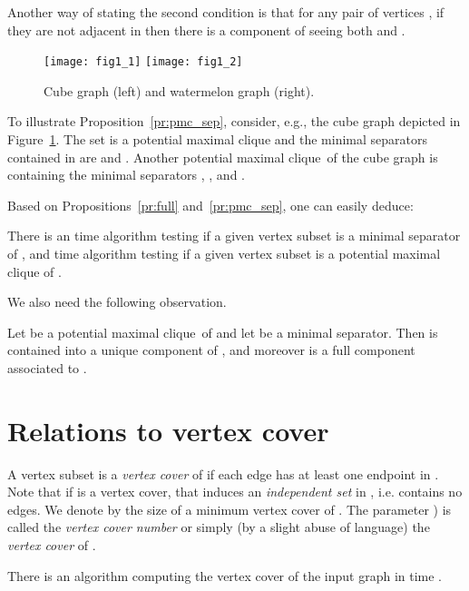 \documentclass{llncs}
\newcommand{\pmc}{potential maximal clique}
\begin{document}
Another way of stating the second condition is that for any pair of vertices , if they are not adjacent in  then 
there is a component  of  seeing both  and . 

\begin{figure}[h]
\label{fi:cubewaterm}
\begin{center}
\texttt{[image: fig1\_1]}
\texttt{[image: fig1\_2]}
\end{center}
\caption{Cube graph (left) and watermelon graph (right).}
\end{figure}


To illustrate Proposition~\ref{pr:pmc_sep}, consider, e.g., the cube graph depicted in Figure~\ref{fi:cubewaterm}. The set  is a potential maximal clique and the minimal separators contained in  are  and . Another \pmc\ of the cube graph is  containing the minimal separators , ,  and . 
 


 
Based on Propositions~\ref{pr:full} and~\ref{pr:pmc_sep}, one can easily deduce:
\begin{corollary}\label{co:pmc_rec}\label{co:sep_rec}
There is an  time algorithm testing if a given vertex subset  is a minimal separator of , and  time algorithm testing if a given vertex subset  is a potential maximal clique of . 
\end{corollary}

We also need the following observation.
\begin{proposition}\label{pr:pmc_comp}
Let  be a \pmc\ of  and let  be a minimal separator. Then  is contained into a unique component  of , and moreover 
 is a full component associated to .
\end{proposition}


\section{Relations to vertex cover}\label{se:vc}
A vertex subset  is a \emph{vertex cover} of  if each edge has at least one endpoint in . Note that if  is a vertex cover, that  induces an \emph{independent set} in , i.e.  contains no edges. We denote by  the size of a minimum vertex cover of . The parameter ) is called the \emph{vertex cover number} or simply (by a slight abuse of language) the \emph{vertex cover} of .

\begin{proposition}[folklore]\label{pr:vc_FPT}
There is an algorithm computing the vertex cover of the input graph in time .
\end{proposition}
\end{document}
